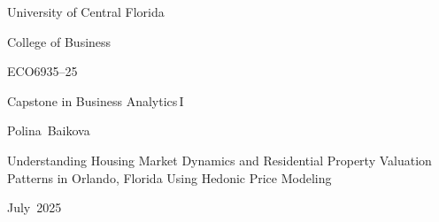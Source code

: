 \documentclass[11pt]{article}
\begin{document}
\begin{titlepage}
    \centering
    \vspace*{1in}
    {\Large University of Central Florida\par}
    \vspace{0.2in}
    {\large College of Business\par}
    {\large ECO6935–25\par}
    {\large Capstone in Business Analytics I\par}
    \vspace{0.4in}
    {\large Polina Baikova\par}
    \vspace{1in}
    {\LARGE Understanding Housing Market Dynamics and Residential Property Valuation Patterns in Orlando, Florida Using Hedonic Price Modeling\par}
    \vfill
    {\large July 2025\par}
\end{titlepage}
\setcounter{page}{1}
\newpage
\renewcommand{\thesection}{\arabic{section}}














\singlespacing
\nocite{*}


\end{document}
